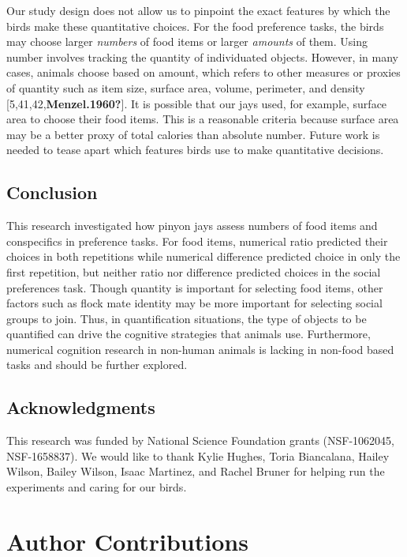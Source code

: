 \documentclass[
  ,doc,floatsintext]{apa6}
\begin{document}
Our study design does not allow us to pinpoint the exact features by which the birds make these quantitative choices. For the food preference tasks, the birds may choose larger \emph{numbers} of food items or larger \emph{amounts} of them. Using number involves tracking the quantity of individuated objects. However, in many cases, animals choose based on amount, which refers to other measures or proxies of quantity such as item size, surface area, volume, perimeter, and density {[}5,41,42,\textbf{Menzel.1960?}{]}. It is possible that our jays used, for example, surface area to choose their food items. This is a reasonable criteria because surface area may be a better proxy of total calories than absolute number. Future work is needed to tease apart which features birds use to make quantitative decisions.

\hypertarget{conclusion}{%
\subsection{Conclusion}\label{conclusion}}

This research investigated how pinyon jays assess numbers of food items and conspecifics in preference tasks. For food items, numerical ratio predicted their choices in both repetitions while numerical difference predicted choice in only the first repetition, but neither ratio nor difference predicted choices in the social preferences task. Though quantity is important for selecting food items, other factors such as flock mate identity may be more important for selecting social groups to join. Thus, in quantification situations, the type of objects to be quantified can drive the cognitive strategies that animals use. Furthermore, numerical cognition research in non-human animals is lacking in non-food based tasks and should be further explored.

\hypertarget{acknowledgments}{%
\subsection{Acknowledgments}\label{acknowledgments}}

This research was funded by National Science Foundation grants (NSF-1062045,
NSF-1658837). We would like to thank Kylie Hughes, Toria Biancalana, Hailey Wilson, Bailey Wilson, Isaac Martinez, and Rachel Bruner for helping run the experiments and caring for our birds.

\hypertarget{author-contributions}{%
\section{Author Contributions}\label{author-contributions}}
\end{document}
